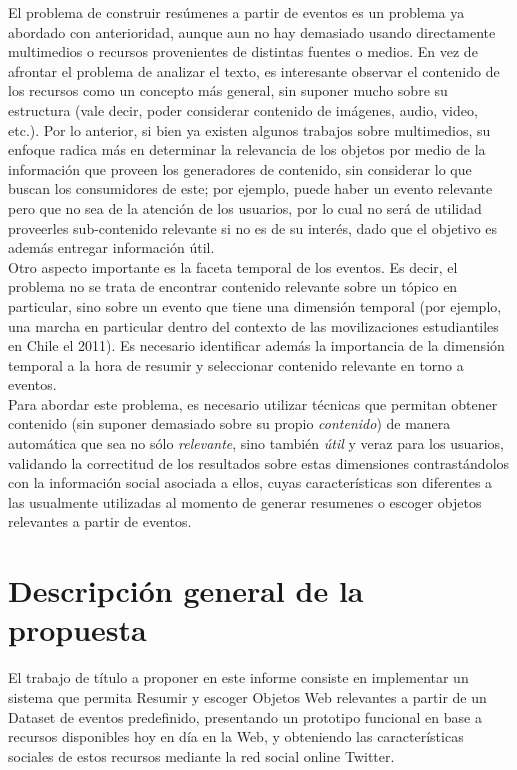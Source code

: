 \documentclass[11pt]{article}
\begin{document}
  El problema de construir resúmenes a partir de eventos es un problema ya abordado con anterioridad, aunque aun no hay demasiado usando directamente multimedios o recursos provenientes de distintas fuentes o medios. En vez de afrontar el problema de analizar el texto, es interesante observar el contenido de los recursos como un concepto más general, sin suponer mucho sobre su estructura (vale decir, poder considerar contenido de imágenes, audio, video, etc.). Por lo anterior, si bien ya existen algunos trabajos sobre multimedios, su enfoque radica más en determinar la relevancia de los objetos por medio de la información que proveen los generadores de contenido, sin considerar lo que buscan los consumidores de este; por ejemplo, puede haber un evento relevante pero que no sea de la atención de los usuarios, por lo cual no será de utilidad proveerles sub-contenido relevante si no es de su interés, dado que el objetivo es además entregar información útil.\\

  Otro aspecto importante es la faceta temporal de los eventos. Es decir, el problema no se trata de encontrar contenido relevante sobre un tópico en particular, sino sobre un evento que tiene una dimensión temporal (por ejemplo, una marcha en particular dentro del contexto de las movilizaciones estudiantiles en Chile el 2011). Es necesario identificar además la importancia de la dimensión temporal a la hora de resumir y seleccionar contenido relevante en torno a eventos.\\

  Para abordar este problema, es necesario utilizar técnicas que permitan obtener contenido (sin suponer demasiado sobre su propio \emph{contenido}) de manera automática que sea no sólo \emph{relevante}, sino también \emph{útil} y veraz para los usuarios, validando la correctitud de los resultados sobre estas dimensiones contrastándolos con la información social asociada a ellos, cuyas características son diferentes a las usualmente utilizadas al momento de generar resumenes o escoger objetos relevantes a partir de eventos.\\

\newpage
\section{Descripción general de la propuesta}
\label{sec-3}


   El trabajo de título a proponer en este informe consiste en implementar un sistema que permita Resumir y escoger Objetos Web relevantes a partir de un Dataset de eventos predefinido, presentando un prototipo funcional en base a recursos disponibles hoy en día en la Web, y obteniendo las características sociales de estos recursos mediante la red social online Twitter. \\
\end{document}
